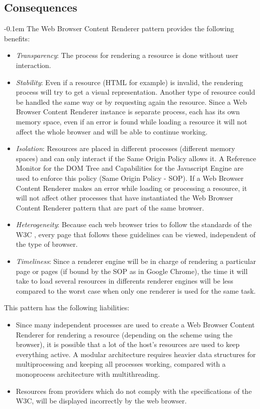 \documentclass[]{acmlarge}
\begin{document}
  \subsection*{Consequences}
  \leftskip-0.1em The Web Browser Content Renderer pattern provides the following benefits:
  \begin{itemize}\leftskip0.2em
    \item \textit{Transparency}: The process for rendering a resource is done without user interaction.
    \item \textit{Stability}: Even if a resource (HTML for example) is invalid, the rendering process will try to get a visual representation. Another type of resource could be handled the same way or by requesting again the resource. Since a Web Browser Content Renderer instance is separate process, each has its own memory space, even if an error is found while loading a resource it will not affect the whole browser and will be able to continue working.
    \item \textit{Isolation}: Resources are placed in different processes (different memory spaces) and can only interact if the Same Origin Policy allows it. A Reference Monitor for the DOM Tree and Capabilities for the Javascript Engine are used to enforce this policy (Same Origin Policy - SOP). If a Web Browser Content Renderer makes an error while loading or processing a resource, it will not affect other processes that have instantiated the Web Browser Content Renderer pattern that are part of the same browser.
    \item \textit{Heterogeneity}: Because each web browser tries to follow the standards of the W3C \cite{w3c}, every page that follows these guidelines can be viewed, independent of the type of browser.
    \item \textit{Timeliness}: Since a renderer engine will be in charge of rendering a particular page or pages (if bound by the SOP as in Google Chrome), the time it will take to load several resources in differents renderer engines will be less compared to the worst case when only one renderer is used for the same task.
  \end{itemize}
  This pattern has the following liabilities:
  \begin{itemize}\leftskip0.2em
    \item Since many independent processes are used to create a Web Browser Content Renderer for rendering a resource (depending on the scheme using the browser), it is possible that a lot of the host's resources are used to keep everything active. A modular architecture requires heavier data structures for multiprocessing and keeping all processes working, compared with a monoprocess architecture with multithreading.
    \item Resources from providers which do not comply with the specifications of the W3C, will be displayed incorrectly by the web browser.
  \end{itemize}
\end{document}
